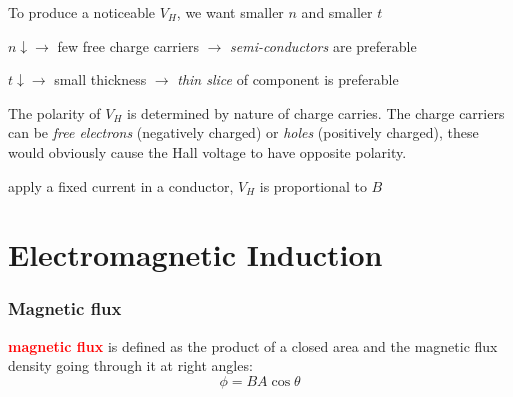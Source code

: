\documentclass[a4paper,12pt]{book}
\newcommand{\cmt}{}
\newenvironment{ilight}
  {\centering
  	\vspace*{6pt}
  	\begin{tcolorbox}[colframe=Gray,colback=LightGrey!15]
  \setlength{\baselineskip}{\baselineskip}%
  }
  {\end{tcolorbox}\vspace*{-4pt}}
\newcommand{\keypoint}[1]{\textbf{\textcolor{red}{#1}}}
\newcommand{\rcyskip}{\vspace{4pt}}
\newcommand{\ra}{\rightarrow}
\newcommand{\tcbhighmath}[1]{\boxed{#1}}
\newcommand{\keypoint}[1]{\textbf{\textcolor{red}{#1}}}
\newcommand{\cmt}{}
\begin{document}
To produce a noticeable $V_H$, we want smaller $n$ and smaller $t$

\begin{compactenum}
	\item[-] $n\downarrow \ra$ few free charge carriers $\ra$ \emph{semi-conductors} are preferable

	\item[-] $t\downarrow \ra$ small thickness $\ra$ \emph{thin slice} of component is preferable

\end{compactenum}

The polarity of $V_H$ is determined by nature of charge carries. The charge carriers can be \emph{free electrons} (negatively charged) or \emph{holes} (positively charged), these would obviously cause the Hall voltage to have opposite polarity.


	
\cmt apply a fixed current in a conductor, $V_H$ is proportional to $B$
	
	


\cleardoublepage

\chapter{Electromagnetic Induction}

\subsection{Magnetic flux}

\rcyskip

\begin{ilight}
	\keypoint{magnetic flux} is defined as the product of a closed area and the magnetic flux density going through it at right angles: $$\tcbhighmath{\phi=BA\cos\theta}$$
\end{ilight}
\end{document}
